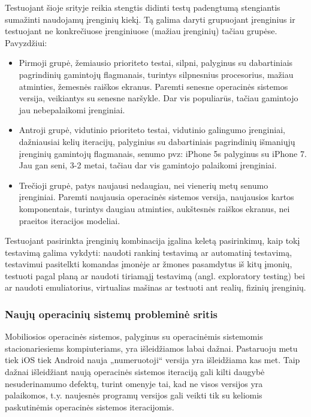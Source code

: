 \documentclass{VUMIFPSkursinis}
\begin{document}
Testuojant šioje srityje reikia stengtis didinti testų padengtumą stengiantis sumažinti naudojamų įrenginių kiekį. Tą galima daryti grupuojant įrenginius ir testuojant ne konkrečiuose įrenginiuose (mažiau įrenginių) tačiau grupėse. Pavyzdžiui:

\begin{itemize}
   \item Pirmoji grupė, žemiausio prioriteto testai, silpni, palyginus su dabartiniais pagrindinių gamintojų flagmanais, turintys silpnesnius procesorius, mažiau atminties, žemesnės raiškos ekranus. Paremti senesne operacinės sistemos versija, veikiantys su senesne naršykle. Dar vis populiarūs, tačiau gamintojo jau nebepalaikomi įrenginiai.

   \item Antroji grupė, vidutinio prioriteto testai, vidutinio galingumo įrenginiai, dažniausiai kelių iteracijų, palyginius su dabartiniais pagrindinių išmaniųjų įrenginių gamintojų flagmanais, senumo pvz: iPhone 5s palyginus su iPhone 7. Jau gan seni, 3-2 metai, tačiau dar vis gamintojo palaikomi įrenginiai.

   \item Trečioji grupė, patys naujausi nedaugiau, nei vienerių metų senumo įrenginiai. Paremti naujausia operacinės sistemos versija, naujausios kartos komponentais, turintys daugiau atminties, aukštesnės raiškos ekranus, nei praeitos iteracijos modeliai.\cite{6496451}
\end{itemize}

Testuojant pasirinkta įrenginių kombinacija įgalina keletą pasirinkimų, kaip tokį testavimą galima vykdyti: naudoti rankinį testavimą ar automatinį testavimą, testavimui pasitelkti komandas įmonėje ar žmones pasamdytus iš kitų įmonių, testuoti pagal planą ar naudoti tiriamąjį testavimą (angl. exploratory testing) bei ar naudoti emuliatorius, virtualias mašinas ar testuoti ant realių, fizinių įrenginių.

\subsubsection{Naujų operacinių sistemų probleminė sritis}
Mobiliosios operacinės sistemos, palyginus su operacinėmis sistemomis stacionariesiems kompiuteriams, yra išleidžiamos labai dažnai. Pastaruoju metu tiek iOS tiek Android nauja „numeruotoji“ versija yra išleidžiama kas met. Taip dažnai išleidžiant naują operacinės sistemos iteraciją gali kilti daugybė nesuderinamumo defektų, turint omenyje tai, kad ne visos versijos yra palaikomos, t.y. naujesnės programų versijos gali veikti tik su keliomis paskutinėmis operacinės sistemos iteracijomis.
\end{document}
